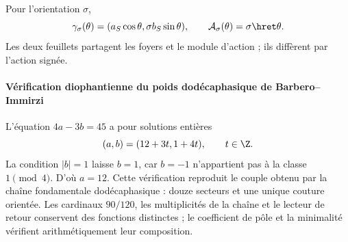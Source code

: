 Pour l'orientation \(\sigma\),
\[
\gamma_\sigma(\theta)
=(a_S\cos\theta,\sigma b_S\sin\theta),
\qquad
\mathcal A_\sigma(\theta)=\sigma\hret\theta.
\]
Les deux feuillets partagent les foyers et le module d'action ; ils diffèrent par l'action signée.

\paragraph{Vérification diophantienne du poids dodécaphasique de Barbero--Immirzi}

L'équation \(4a-3b=45\) a pour solutions entières
\[
(a,b)=(12+3t,1+4t),\qquad t\in\Z.
\]
La condition \(|b|=1\) laisse \(b=1\), car \(b=-1\) n'appartient pas à la classe
\(1\pmod4\). D'où \(a=12\). Cette vérification reproduit le couple obtenu par la chaîne fondamentale
dodécaphasique : douze secteurs et une unique couture orientée. Les cardinaux
\(90/120\), les multiplicités de la chaîne et le lecteur de retour
conservent des fonctions distinctes ; le coefficient de pôle et la minimalité
vérifient arithmétiquement leur composition.
